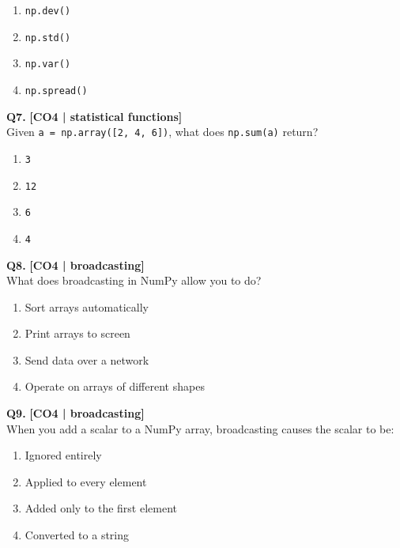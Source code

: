 \begin{enumerate}[label=(\alph*),topsep=2pt,itemsep=1pt,partopsep=0pt,parsep=0pt]
    \item \relax \texttt{np.dev()}
    \item \relax \texttt{np.std()}
    \item \relax \texttt{np.var()}
    \item \relax \texttt{np.spread()}
\end{enumerate}
\vspace{{2mm}}

\noindent\textbf{Q7.} \hfill {\small\color{LPUOrange}\textbf{[CO4 | statistical functions]}}\\[2pt]
Given \texttt{a = np.array([2, 4, 6])}, what does \texttt{np.sum(a)} return?

\begin{enumerate}[label=(\alph*),topsep=2pt,itemsep=1pt,partopsep=0pt,parsep=0pt]
    \item \relax \texttt{3}
    \item \relax \texttt{12}
    \item \relax \texttt{6}
    \item \relax \texttt{4}
\end{enumerate}
\vspace{{2mm}}

\noindent\textbf{Q8.} \hfill {\small\color{LPUOrange}\textbf{[CO4 | broadcasting]}}\\[2pt]
What does broadcasting in NumPy allow you to do?

\begin{enumerate}[label=(\alph*),topsep=2pt,itemsep=1pt,partopsep=0pt,parsep=0pt]
    \item \relax Sort arrays automatically
    \item \relax Print arrays to screen
    \item \relax Send data over a network
    \item \relax Operate on arrays of different shapes
\end{enumerate}
\vspace{{2mm}}

\noindent\textbf{Q9.} \hfill {\small\color{LPUOrange}\textbf{[CO4 | broadcasting]}}\\[2pt]
When you add a scalar to a NumPy array, broadcasting causes the scalar to be:

\begin{enumerate}[label=(\alph*),topsep=2pt,itemsep=1pt,partopsep=0pt,parsep=0pt]
    \item \relax Ignored entirely
    \item \relax Applied to every element
    \item \relax Added only to the first element
    \item \relax Converted to a string
\end{enumerate}
\vspace{{2mm}}

